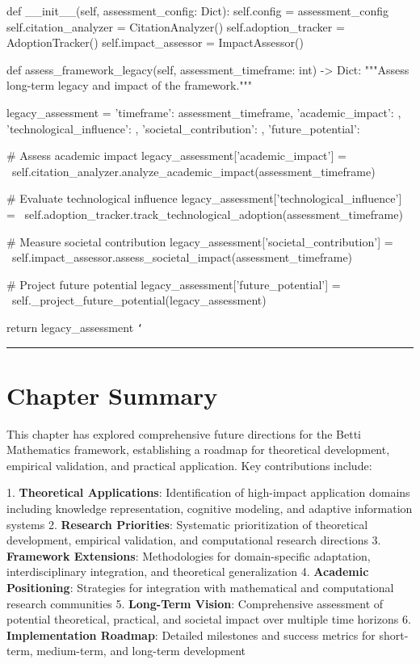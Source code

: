     def __init__(self, assessment_config: Dict):
        self.config = assessment_config
        self.citation_analyzer = CitationAnalyzer()
        self.adoption_tracker = AdoptionTracker()
        self.impact_assessor = ImpactAssessor()
        
    def assess_framework_legacy(self, assessment_timeframe: int) -> Dict:
        """Assess long-term legacy and impact of the framework."""
        
        legacy_assessment = {
            'timeframe': assessment_timeframe,
            'academic_impact': {},
            'technological_influence': {},
            'societal_contribution': {},
            'future_potential': {}
        }
        
        \# Assess academic impact
        legacy_assessment['academic_impact'] = \
            self.citation_analyzer.analyze_academic_impact(assessment_timeframe)
        
        \# Evaluate technological influence
        legacy_assessment['technological_influence'] = \
            self.adoption_tracker.track_technological_adoption(assessment_timeframe)
        
        \# Measure societal contribution
        legacy_assessment['societal_contribution'] = \
            self.impact_assessor.assess_societal_impact(assessment_timeframe)
        
        \# Project future potential
        legacy_assessment['future_potential'] = \
            self._project_future_potential(legacy_assessment)
        
        return legacy_assessment
\texttt{`}

\hrule

\section{Chapter Summary}

This chapter has explored comprehensive future directions for the Betti Mathematics framework, establishing a roadmap for theoretical development, empirical validation, and practical application. Key contributions include:

1. \textbf{Theoretical Applications}: Identification of high-impact application domains including knowledge representation, cognitive modeling, and adaptive information systems
2. \textbf{Research Priorities}: Systematic prioritization of theoretical development, empirical validation, and computational research directions
3. \textbf{Framework Extensions}: Methodologies for domain-specific adaptation, interdisciplinary integration, and theoretical generalization
4. \textbf{Academic Positioning}: Strategies for integration with mathematical and computational research communities
5. \textbf{Long-Term Vision}: Comprehensive assessment of potential theoretical, practical, and societal impact over multiple time horizons
6. \textbf{Implementation Roadmap}: Detailed milestones and success metrics for short-term, medium-term, and long-term development

